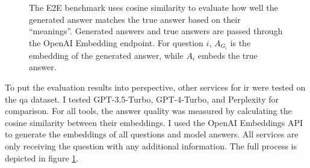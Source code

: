 \documentclass[../main.tex]{subfiles}
\begin{document}
\begin{figure}[t]
    \centering
    \caption{The E2E benchmark uses cosine similarity to evaluate how
        well the generated answer matches the true answer based on their ``meanings''.
        Generated answers and true answers are passed through the OpenAI Embedding
        endpoint. For question $i$, $A_{G_i}$ is the embedding of the generated answer,
        while $A_i$ embeds the true answer.}
    \label{fig:benchmark}
\end{figure}

To put the evaluation results into perspective,
other services for \gls{ir} were tested on the \gls{qa} dataset.
I tested GPT-3.5-Turbo, GPT-4-Turbo, and Perplexity for comparison.
For all tools, the answer quality was measured
by calculating the cosine similarity between their embeddings.
I used the OpenAI Embeddings API \cite{zotero-253} to generate the embeddings of all questions and model answers.
All services are only receiving the question with any additional information.
The full process is depicted in figure \ref{fig:benchmark}.
\end{document}
